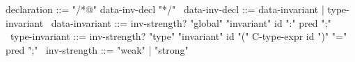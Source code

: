 \begin{syntax}
  declaration ::= "/*@" data-inv-decl "*/"
  \
  data-inv-decl ::= data-invariant | type-invariant
  \
  data-invariant ::= inv-strength? "global" "invariant" id ":" pred ";"
  \
  type-invariant ::= inv-strength? "type" "invariant" id "(" C-type-expr id ")" "=" pred ";"
  \
  inv-strength ::= "weak" | "strong"
\end{syntax}